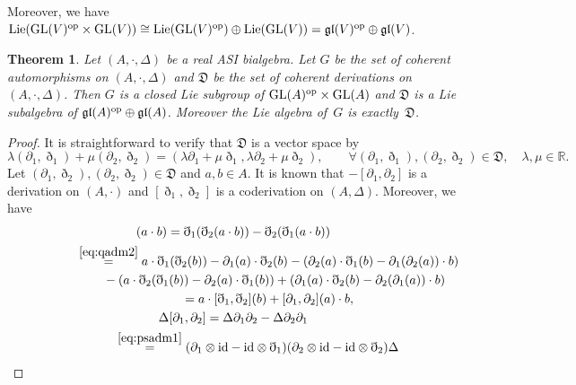 \documentclass[10pt,a4paper]{amsart}
\numberwithin{equation}{section}
\newtheorem{Theorem}{Theorem}[section]
\newcommand{\id}{\mathrm{id}}
\begin{document}
Moreover, we have ${\rm Lie}({\rm GL}(V)^{\rm op} \times {\rm GL}(V)) \cong {\rm Lie}({\rm GL}(V)^{\rm op}) \oplus {\rm Lie}({\rm GL}(V)) = \mathfrak{gl}(V)^{\rm op} \oplus \mathfrak{gl}(V)$.


\begin{Theorem}
 Let $(A, \cdot, \Delta)$ be a real ASI bialgebra.
 Let $G$ be the set of coherent automorphisms on $(A, \cdot, \Delta)$ and $\mathfrak{D}$ be the set of coherent derivations on $(A, \cdot, \Delta)$.
 Then $G$ is a closed Lie subgroup of ${\rm GL}(A)^{\rm op} \times {\rm GL}(A)$ and $\mathfrak{D}$ is a Lie subalgebra of $\mathfrak{gl}(A)^{\rm op} \oplus \mathfrak{gl}(A)$.
 Moreover the Lie algebra of~$G$ is exactly~$\mathfrak D$.
\end{Theorem}
\begin{proof}
It is straightforward to verify that $\mathfrak{D}$ is a vector space by
\begin{equation*}
 \lambda (\partial_1, \eth_1) + \mu (\partial_2, \eth_2) = (\lambda \partial_1 + \mu\eth_1, \lambda \partial_2 + \mu \eth_2), \qquad
 \forall (\partial_1, \eth_1), (\partial_2, \eth_2) \in \mathfrak{D},\quad
 \lambda, \mu \in \mathbb{R}.
\end{equation*}
Let $(\partial_1, \eth_2),(\partial_2, \eth_2) \in \mathfrak{D}$ and $a, b \in A$.
It is known that $-[\partial_1,\partial_2]$ is a derivation on $(A, \cdot)$ and $[\eth_1,\eth_2]$ is a coderivation on $(A, \Delta)$.
Moreover, we have
\begin{gather*}
 [\eth_1,\eth_2](a \cdot b) = \eth_1(\eth_2(a \cdot b)) - \eth_2(\eth_1(a \cdot b)) \\
 \hspace*{19mm}{}
 \overset{\eqref{eq:qadm2}}{=} a \cdot \eth_1(\eth_2(b)) - \partial_1(a) \cdot \eth_2(b) - (\partial_2(a) \cdot \eth_1(b) - \partial_1(\partial_2(a)) \cdot b ) \\
 \hphantom{[\eth_1,\eth_2](a \cdot b) =}{}
 - (a \cdot \eth_2(\eth_1(b)) - \partial_2(a) \cdot \eth_1(b)) + (\partial_1(a) \cdot \eth_2(b) - \partial_2(\partial_1(a)) \cdot b ) \\
 \hphantom{[\eth_1,\eth_2](a \cdot b)}{}= a \cdot [\eth_1,\eth_2](b) + [\partial_1,\partial_2](a) \cdot b, \\
 \Delta [\partial_1,\partial_2] = \Delta \partial_1 \partial_2 - \Delta \partial_2 \partial_1 \\
 \hspace*{13mm}{} \overset{\eqref{eq:psadm1}}{=} (\partial_1 \otimes \id - \id \otimes \eth_1) (\partial_2 \otimes \id - \id \otimes \eth_2)\Delta \\

\end{gather*}
\end{proof}
\end{document}
